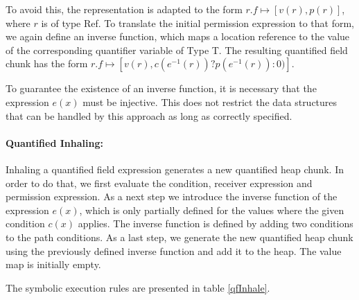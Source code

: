 \documentclass[12pt]{article}
\begin{document}
To avoid this, the representation is adapted to the form \(r.f \mapsto [v(r), p(r)]\), where \(r\) is of type Ref. To translate the initial permission expression to that form, we again define an inverse function, which maps a location reference to the value of the corresponding quantifier variable of Type T. The resulting quantified field chunk has the form \(r.f \mapsto [v(r), c(e^{-1}(r)) ? p(e^{-1}(r)) : 0)]\). %

To guarantee the existence of an inverse function, it is necessary that the expression \(e(x)\) must be injective. This does not restrict the data structures that can be handled by this approach as long as correctly specified.

\paragraph{Quantified Inhaling:}
Inhaling a quantified field expression generates a new quantified heap chunk. In order to do that, we first evaluate the condition, receiver expression and permission expression. As a next step we introduce the inverse function of the expression \(e(x)\), which is only partially defined for the values where the given condition \(c(x)\) applies. The inverse function is defined by adding two conditions to the path conditions. As a last step, we generate the new quantified heap chunk using the previously defined inverse function  and add it to the heap. The value map is initially empty.

The symbolic execution rules are presented in table \ref{qfInhale}.
\end{document}
